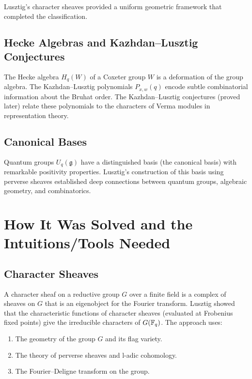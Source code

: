Lusztig's character sheaves provided a uniform geometric framework that completed the classification.

\subsection{Hecke Algebras and Kazhdan--Lusztig Conjectures}

The Hecke algebra $H_q(W)$ of a Coxeter group $W$ is a deformation of the group algebra. The Kazhdan--Lusztig polynomials $P_{x,w}(q)$ encode subtle combinatorial information about the Bruhat order. The Kazhdan--Lusztig conjectures (proved later) relate these polynomials to the characters of Verma modules in representation theory.

\subsection{Canonical Bases}

Quantum groups $U_q(\mathfrak{g})$ have a distinguished basis (the canonical basis) with remarkable positivity properties. Lusztig's construction of this basis using perverse sheaves established deep connections between quantum groups, algebraic geometry, and combinatorics.

\section{How It Was Solved and the Intuitions/Tools Needed}

\subsection{Character Sheaves}

A character sheaf on a reductive group $G$ over a finite field is a complex of sheaves on $G$ that is an eigenobject for the Fourier transform. Lusztig showed that the characteristic functions of character sheaves (evaluated at Frobenius fixed points) give the irreducible characters of $G(\mathbb{F}_q)$. The approach uses:
\begin{enumerate}
    \item The geometry of the group $G$ and its flag variety.
    \item The theory of perverse sheaves and l-adic cohomology.
    \item The Fourier--Deligne transform on the group.
\end{enumerate}

